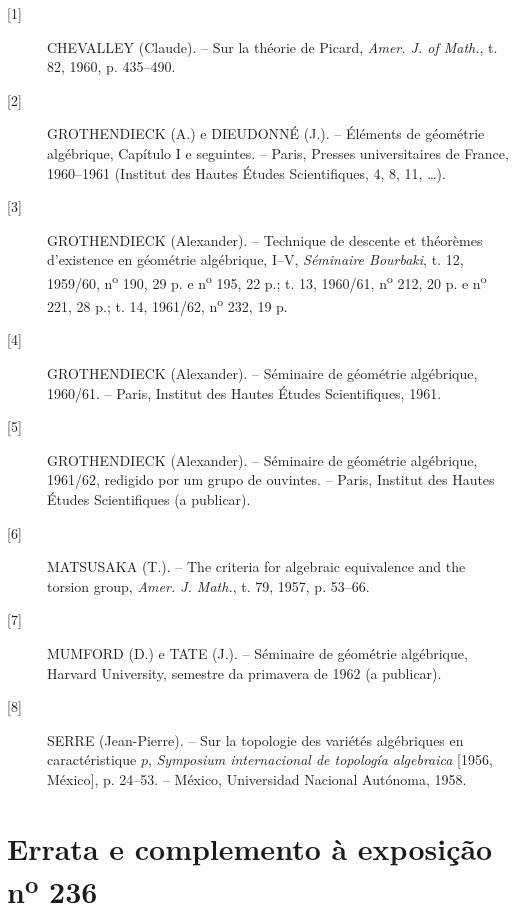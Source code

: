 \documentclass[11pt,twoside,openany]{book}
\numberwithin{equation}{section}
\newcommand{\src}[1]{%
  \phantomsection\hypertarget{src:#1}{}%
  \marginpar{\raggedleft\footnotesize\sffamily #1}%
}
\newcommand{\sid}[1]{\phantomsection\hypertarget{fga:#1}{}}
\theoremstyle{plain}
\theoremstyle{definition}
\theoremstyle{remark}
\newcommand{\FgaUnitKey}{frontmatter}
\renewcommand{\src}[1]{%
  \phantomsection\hypertarget{src:\FgaUnitKey:#1}{}%
  \marginpar{\raggedleft\footnotesize\sffamily #1}%
}
\begin{document}
\begin{description}
\item[{[1]}] CHEVALLEY (Claude). -- Sur la théorie de Picard,
\emph{Amer. J. of Math.}, t. 82, 1960, p. 435--490.

\item[{[2]}] GROTHENDIECK (A.) e DIEUDONNÉ (J.). -- Éléments de géométrie
algébrique, Capítulo I e seguintes. -- Paris, Presses universitaires de France,
1960--1961 (Institut des Hautes Études Scientifiques, 4, 8, 11, \ldots).

\item[{[3]}] GROTHENDIECK (Alexander). -- Technique de descente et théorèmes
d'existence en géométrie algébrique, I--V, \emph{Séminaire Bourbaki}, t. 12,
1959/60, n\textsuperscript{o} 190, 29 p. e n\textsuperscript{o} 195, 22 p.;
t. 13, 1960/61, n\textsuperscript{o} 212, 20 p. e
n\textsuperscript{o} 221, 28 p.; t. 14, 1961/62,
n\textsuperscript{o} 232, 19 p.

\item[{[4]}] GROTHENDIECK (Alexander). -- Séminaire de géométrie algébrique,
1960/61. -- Paris, Institut des Hautes Études Scientifiques, 1961.

\item[{[5]}] GROTHENDIECK (Alexander). -- Séminaire de géométrie algébrique,
1961/62, redigido por um grupo de ouvintes. -- Paris, Institut des Hautes Études
Scientifiques (a publicar).

\item[{[6]}] MATSUSAKA (T.). -- The criteria for algebraic equivalence and the
torsion group, \emph{Amer. J. Math.}, t. 79, 1957, p. 53--66.

\item[{[7]}] MUMFORD (D.) e TATE (J.). -- Séminaire de géométrie algébrique,
Harvard University, semestre da primavera de 1962 (a publicar).

\item[{[8]}] SERRE (Jean-Pierre). -- Sur la topologie des variétés algébriques
en caractéristique $p$, \emph{Symposium internacional de topología algebraica}
[1956, México], p. 24--53. -- México, Universidad Nacional Autónoma, 1958.
\end{description}

\par

\def\FgaUnitKey{e236}\clearpage
\chapter*{Errata e complemento à exposição n\textsuperscript{o} 236}
\sid{e236}
\src{303}
\end{document}
